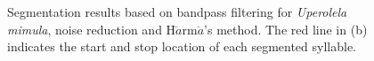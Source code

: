 \begin{figure}[htb!]
        \caption[Segmentation results based on bandpass filtering]{Segmentation results based on bandpass filtering for \textit{Uperolela mimula}, noise reduction and H$\ddot{a}$rm$\ddot{a}$'s method. The red line in (b) indicates the start and stop location of each segmented syllable.}       
        \label{fig:Ch5_segmentation}
\end{figure}






